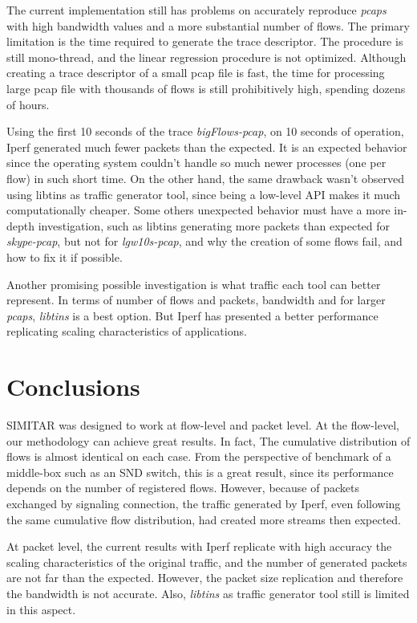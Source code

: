 The current implementation still has problems on accurately reproduce \textit{pcaps} with high bandwidth values and a more substantial number of flows. The primary limitation is the time required to generate the trace descriptor.  The procedure is still mono-thread, and the linear regression procedure is not optimized. Although creating a trace descriptor of a small pcap file is fast, the time for processing large pcap file with thousands of flows is still prohibitively high, spending dozens of hours. 

Using the first 10 seconds of the trace \textit{bigFlows-pcap}, on 10 seconds of operation, Iperf generated much fewer packets than the expected. It is an expected behavior since the operating system couldn't handle so much newer processes (one per flow) in such short time. On the other hand, the same drawback wasn't observed using libtins as traffic generator tool, since being a low-level API makes it much computationally cheaper.  Some others unexpected behavior must have a more in-depth investigation, such as libtins generating more packets than expected for \textit{skype-pcap}, but not for \textit{lgw10s-pcap}, and why the creation of some flows fail, and how to fix it if possible. 

Another promising possible investigation is what traffic each tool can better represent. In terms of number of flows and packets, bandwidth and for larger \textit{pcaps}, \textit{libtins} is a best option. But Iperf has presented a better performance replicating scaling characteristics of applications. 


\section{Conclusions}


SIMITAR was designed to work at flow-level and packet level. At the flow-level, our methodology can achieve great results. In fact,  The cumulative distribution of flows is almost identical on each case. From the perspective of benchmark of a middle-box such as an SND switch, this is a great result, since its performance depends on the number of registered flows. However, because of packets exchanged by signaling connection, the traffic generated by Iperf, even following the same cumulative flow distribution, had created more streams then expected. 

At packet level, the current results with Iperf replicate with high accuracy the scaling characteristics of the original traffic, and the number of generated packets are not far than the expected. However, the packet size replication and therefore the bandwidth is not accurate. Also, \textit{libtins} as traffic generator tool still is limited in this aspect.

